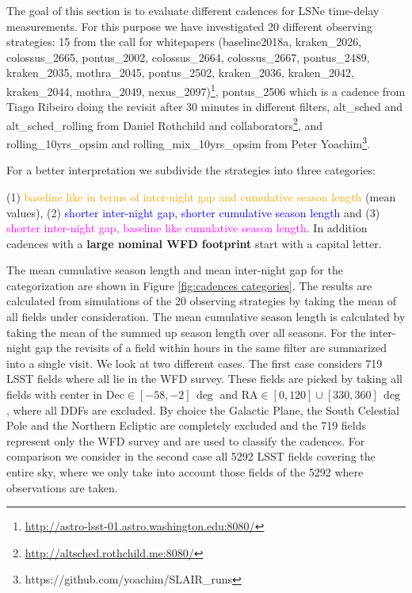 The goal of this section is to evaluate different
cadences for LSNe time-delay measurements. For this purpose we have investigated
20 different observing strategies: 15 from the call for whitepapers
(baseline2018a, kraken\_2026, colossus\_2665, pontus\_2002,
colossus\_2664, colossus\_2667, pontus\_2489, kraken\_2035,
mothra\_2045, pontus\_2502,
kraken\_2036, kraken\_2042, kraken\_2044, mothra\_2049, nexus\_2097)\footnote{\url{http://astro-lsst-01.astro.washington.edu:8080/}},
pontus\_2506 which is a cadence from Tiago Ribeiro doing the revisit
after 30 minutes in different filters, alt\_sched and
alt\_sched\_rolling from Daniel Rothchild and collaborators\footnote{\url{http://altsched.rothchild.me:8080/}}, and rolling\_10yrs\_opsim and rolling\_mix\_10yrs\_opsim from Peter Yoachim\footnote{https://github.com/yoachim/SLAIR\_runs}. 

For a better interpretation we subdivide the strategies into three categories: 

(1) \textcolor{orange} {baseline like in terms of inter-night gap and cumulative season length} (mean values), (2) \textcolor{blue}{shorter inter-night gap, shorter cumulative season length} and (3) \textcolor{magenta}{shorter inter-night gap, baseline like cumulative season length}. In addition cadences with a \textbf{large nominal WFD footprint} start with a capital letter.

The mean cumulative season length and mean inter-night gap for the categorization are shown in Figure \ref{fig:cadences categories}. The results are calculated from simulations of the 20 observing strategies by taking the mean of all fields under consideration. The mean cumulative season length is calculated by taking the mean of the summed up season length over all seasons. For the inter-night gap the revisits of a field within hours in the same filter are summarized into a single visit. We look at two different cases. The first case considers 719 LSST fields where all lie in the WFD survey. These fields are picked by taking all fields with center in $\mathrm{Dec} \in [-58,-2] \, \si{\deg}$ and  $\mathrm{RA} \in [0,120] \cup [330,360] \, \si{\deg}$, where all DDFs are excluded. By choice the Galactic Plane, the South Celestial Pole and the Northern Ecliptic are completely excluded and the 719 fields represent only the WFD survey and are used to classify the cadences. For comparison we consider in the second case all 5292 LSST fields covering the entire sky, where we only take into account those fields of the 5292 where observations are taken.


